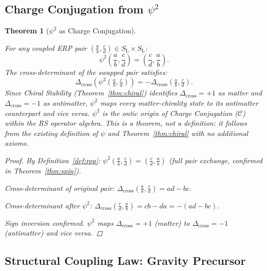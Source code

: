 \documentclass[11pt, letterpaper]{article}
\newcommand{\SL}{S_{\mathrm{L}}}
\newcommand{\Dcross}{\Delta_{\mathrm{cross}}}
\theoremstyle{definition}
\theoremstyle{plain}
\newtheorem{theorem}{Theorem}[section]
\begin{document}
\subsection{Charge Conjugation from $\psi^2$}

\begin{theorem}[$\psi^2$ as Charge Conjugation]\label{thm:cc}
\begin{rsbox}
For any coupled ERP pair $\left(\tfrac{a}{b},\tfrac{c}{d}\right)\in\SL\times\SL$:
\[
\psi^2\!\left(\frac{a}{b},\frac{c}{d}\right) = \left(\frac{c}{d},\frac{a}{b}\right).
\]
The cross-determinant of the swapped pair satisfies:
\[
\Dcross\!\left(\psi^2\!\left(\tfrac{a}{b},\tfrac{c}{d}\right)\right) = -\Dcross\!\left(\tfrac{a}{b},\tfrac{c}{d}\right).
\]
Since Chiral Stability (Theorem~\ref{thm:chiral}) identifies $\Dcross=+1$
as matter and $\Dcross=-1$ as antimatter, $\psi^2$ maps every matter-chirality
state to its antimatter counterpart and vice versa.  $\psi^2$ is the ontic
origin of Charge Conjugation ($\mathcal{C}$) within the RS operator algebra.
This is a theorem, not a definition: it follows from the existing definition
of $\psi$ and Theorem~\ref{thm:chiral} with no additional axioms.
\end{rsbox}
\begin{proof}
By Definition~\ref{def:rop}:
$\psi^2\!\left(\tfrac{a}{b},\tfrac{c}{d}\right) = \left(\tfrac{c}{d},\tfrac{a}{b}\right)$
(full pair exchange, confirmed in Theorem~\ref{thm:spin}).

Cross-determinant of original pair:
$\Dcross\!\left(\tfrac{a}{b},\tfrac{c}{d}\right) = ad - bc$.

Cross-determinant after $\psi^2$:
$\Dcross\!\left(\tfrac{c}{d},\tfrac{a}{b}\right) = cb - da = -(ad-bc)$.

Sign inversion confirmed.  $\psi^2$ maps $\Dcross=+1$ (matter) to
$\Dcross=-1$ (antimatter) and vice versa.
\end{proof}
\end{theorem}

\subsection{Structural Coupling Law: Gravity Precursor}
\end{document}
